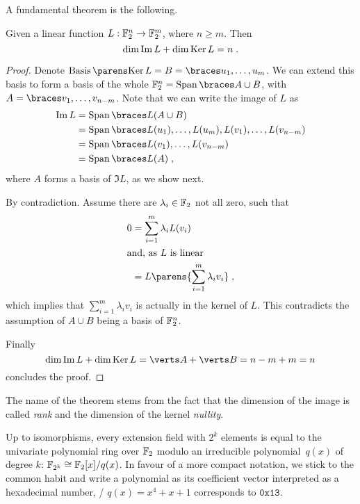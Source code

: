 A fundamental theorem is the following.
\begin{theorem}\label{thm:rank-nullity}
    Given a linear function $L : \mathbb{F}_2^n \to \mathbb{F}_2^m$, where $n \geqslant m$.
    Then
    \begin{equation*}
        \dim{\operatorname{Im}{L}} + \dim{\operatorname{Ker}{L}} = n\;.
    \end{equation*}
\end{theorem}
\begin{proof}
    Denote $\Basis{\Ker{L}} = B = \set{u_1, \ldots, u_m}$.
    We can extend this basis to form a basis of the whole $\F_2^n = \Span{A \cup B}$, with $A = \set{v_1, \ldots, v_{n-m}}$.
    Note that we can write the image of $L$ as
    \begin{align*}
        \Im{L} &= \Span{L(A \cup B)} \\
               &= \Span{L(u_1), \ldots, L(u_m), L(v_1), \ldots, L(v_{n-m})} \\
               &= \Span{L(v_1), \ldots, L(v_{n-m})} \\
               &= \Span{L(A)}\;,
    \end{align*}
    where $A$ forms a basis of $\Im{L}$, as we show next.

    By contradiction.
    Assume there are $\lambda_i \in \mathbb{F}_2$ not all zero, such that
    \begin{align*}
        0 &= \sum_{i=1}^m \lambda_i L(v_i) \\
        \intertext{and, as $L$ is linear}
          &= L\parens{\sum_{i=1}^m \lambda_i v_i}\;,
    \end{align*}
    which implies that $\sum_{i=1}^m \lambda_i v_i$ is actually in the kernel of $L$.
    This contradicts the assumption of $A \cup B$ being a basis of $\mathbb{F}_2^n$.

    Finally
    \begin{equation*}
        \dim{\Im{L}} + \dim{\Ker{L}} = \abs{A} + \abs{B} = n-m + m = n
    \end{equation*}
    concludes the proof.
\end{proof}
The name of the theorem stems from the fact that the dimension of the image is called \emph{rank} and the dimension of the kernel \emph{nullity}.

Up to isomorphisms, every extension field with $2^k$ elements is equal to the univariate polynomial ring over $\mathbb{F}_2$ modulo an irreducible polynomial~$q(x)$ of degree $k$: $\mathbb{F}_{2^k} \cong \mathbb{F}_2[x]/q(x)$.
In favour of a more compact notation, we stick to the common habit and write a polynomial as its coefficient vector interpreted as a hexadecimal number, \ie/ $q(x) = x^4 + x + 1$ corresponds to $\mathtt{0x13}$.

